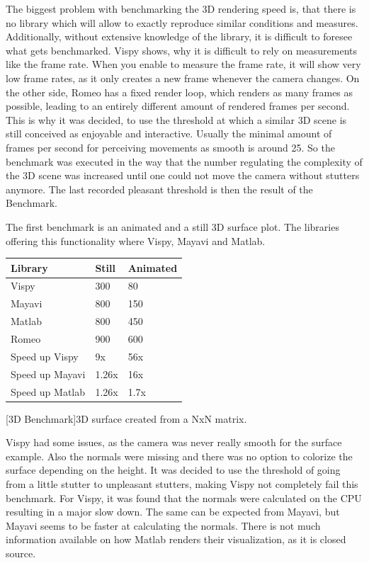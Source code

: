 The biggest problem with benchmarking the 3D rendering speed is, that there is no library which will allow to exactly reproduce similar conditions and measures. 
Additionally, without extensive knowledge of the library, it is difficult to foresee what gets benchmarked. 
Vispy shows, why it is difficult to rely on measurements like the frame rate. When you enable to measure the frame rate, it will show very low frame rates, as it only creates a new frame whenever the camera changes.
On the other side, Romeo has a fixed render loop, which renders as many frames as possible, leading to an entirely different amount of rendered frames per second. 
This is why it was decided, to use the threshold at which a similar 3D scene is still conceived as enjoyable and interactive. Usually the minimal amount of frames per second for perceiving movements as smooth is around 25.
So the benchmark was executed in the way that the number regulating the complexity of the 3D scene was increased until one could not move the camera without stutters anymore. The last recorded pleasant threshold is then the result of the Benchmark.

The first benchmark is an animated and a still 3D surface plot. The libraries offering this functionality where Vispy, Mayavi and Matlab.

\begin{table}[htbp]
    \centering
    \begin{tabular}{l|l|l}
        \hline
        \textbf{Library} & \textbf{Still} & \textbf{Animated} \\
        \hline
        Vispy            & 300            & 80    \\
        Mayavi           & 800            & 150   \\
        Matlab           & 800            & 450   \\
        Romeo            & 900            & 600   \\
        \hline
        \hline
        Speed up Vispy   & 9x            & 56x   \\
        Speed up Mayavi  & 1.26x         & 16x   \\
        Speed up Matlab  & 1.26x         & 1.7x  \\
    \end{tabular}
    [3D Benchmark]{3D surface created from a NxN matrix.}
    \label{table:relativespeedoglw}
\end{table}
Vispy had some issues, as the camera was never really smooth for the surface example. Also the normals were missing and there was no option to colorize the surface depending on the height.
It was decided to use the threshold of going from a little stutter to unpleasant stutters, making Vispy not completely fail this benchmark.
For Vispy, it was found that the normals were calculated on the CPU resulting in a major slow down\cite{VispyGithub}. The same can be expected from Mayavi, but Mayavi seems to be faster at calculating the normals.
There is not much information available on how Matlab renders their visualization, as it is closed source.


